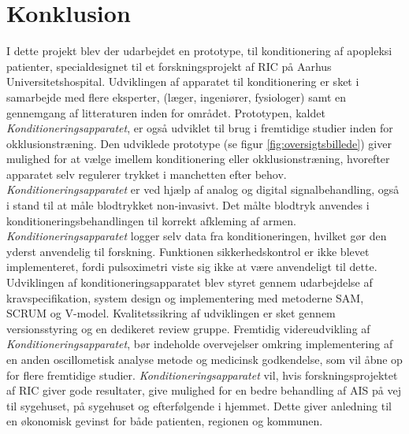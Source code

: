 \chapter{Konklusion}
I dette projekt blev der udarbejdet en prototype, til konditionering af apopleksi patienter, specialdesignet til et forskningsprojekt af RIC på Aarhus Universitetshospital. Udviklingen af apparatet til konditionering er sket i samarbejde med flere eksperter, (læger, ingeniører, fysiologer) samt en gennemgang af litteraturen inden for området. Prototypen, kaldet \textit{Konditioneringsapparatet}, er også udviklet til brug i fremtidige studier inden for okklusionstræning.
Den udviklede prototype (se figur \ref{fig:oversigtsbillede}) giver mulighed for at vælge imellem konditionering eller okklusionstræning, hvorefter apparatet selv regulerer trykket i manchetten efter behov. \textit{Konditioneringsapparatet} er ved hjælp af analog og digital signalbehandling, også i stand til at måle blodtrykket non-invasivt. Det målte blodtryk anvendes i konditioneringsbehandlingen til korrekt afkleming af armen. \textit{Konditioneringsapparatet} logger selv data fra konditioneringen, hvilket gør den yderst anvendelig til forskning. Funktionen sikkerhedskontrol er ikke blevet implementeret, fordi pulsoximetri viste sig ikke at være anvendeligt til dette.
Udviklingen af konditioneringsapparatet blev styret gennem udarbejdelse af kravspecifikation, system design og implementering med metoderne SAM, SCRUM og V-model. Kvalitetssikring af udviklingen er sket gennem versionsstyring og en dedikeret review gruppe.
Fremtidig videreudvikling af \textit{Konditioneringsapparatet}, bør indeholde overvejelser omkring implementering af en anden oscillometisk analyse metode og medicinsk godkendelse, som vil åbne op for flere fremtidige studier.
\textit{Konditioneringsapparatet} vil, hvis forskningsprojektet af RIC giver gode resultater, give mulighed for en bedre behandling af AIS på vej til sygehuset, på sygehuset og efterfølgende i hjemmet. Dette giver anledning til en økonomisk gevinst for både patienten, regionen og kommunen. 

\label{SidsteSide}






